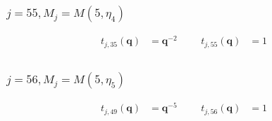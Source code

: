 \subsubsection{$j=55, M_{j}=M(5,\eta_{4})$}
\begin{align*}
t_{j,35}(\boldsymbol{q})&=\boldsymbol{q}^{-2} &&& t_{j,55}(\boldsymbol{q})&=1 \\
\end{align*}

\subsubsection{$j=56, M_{j}=M(5,\eta_{5})$}
\begin{align*}
t_{j,49}(\boldsymbol{q})&=\boldsymbol{q}^{-5} &&& t_{j,56}(\boldsymbol{q})&=1 \\
\end{align*}


